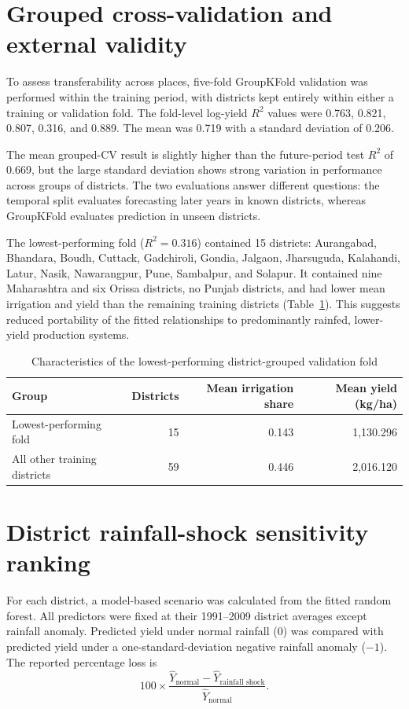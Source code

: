 \documentclass[11pt]{article}
\begin{document}
\section{Grouped cross-validation and external validity}

To assess transferability across places, five-fold GroupKFold validation was performed within the training period, with districts kept entirely within either a training or validation fold. The fold-level log-yield $R^2$ values were 0.763, 0.821, 0.807, 0.316, and 0.889. The mean was 0.719 with a standard deviation of 0.206.

The mean grouped-CV result is slightly higher than the future-period test $R^2$ of 0.669, but the large standard deviation shows strong variation in performance across groups of districts. The two evaluations answer different questions: the temporal split evaluates forecasting later years in known districts, whereas GroupKFold evaluates prediction in unseen districts.

The lowest-performing fold ($R^2=0.316$) contained 15 districts: Aurangabad, Bhandara, Boudh, Cuttack, Gadchiroli, Gondia, Jalgaon, Jharsuguda, Kalahandi, Latur, Nasik, Nawarangpur, Pune, Sambalpur, and Solapur. It contained nine Maharashtra and six Orissa districts, no Punjab districts, and had lower mean irrigation and yield than the remaining training districts (Table~\ref{tab:hardfold}). This suggests reduced portability of the fitted relationships to predominantly rainfed, lower-yield production systems.

\begin{table}[H]
\centering
\caption{Characteristics of the lowest-performing district-grouped validation fold}
\label{tab:hardfold}
\begin{tabular}{lrrr}
\toprule
Group & Districts & Mean irrigation share & Mean yield (kg/ha) \\
\midrule
Lowest-performing fold & 15 & 0.143 & 1,130.296 \\
All other training districts & 59 & 0.446 & 2,016.120 \\
\bottomrule
\end{tabular}
\end{table}

\section{District rainfall-shock sensitivity ranking}

For each district, a model-based scenario was calculated from the fitted random forest. All predictors were fixed at their 1991--2009 district averages except rainfall anomaly. Predicted yield under normal rainfall ($0$) was compared with predicted yield under a one-standard-deviation negative rainfall anomaly ($-1$). The reported percentage loss is
\[
100 \times \frac{\widehat{Y}_{\text{normal}} - \widehat{Y}_{\text{rainfall shock}}}{\widehat{Y}_{\text{normal}}}.
\]
\end{document}
